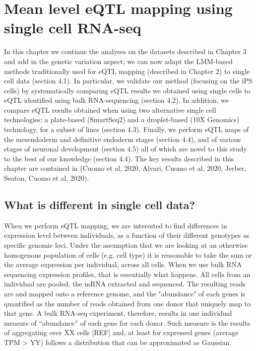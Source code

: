 
\chapter{Mean level eQTL mapping using single cell RNA-seq}

In this chapter we continue the analyses on the datasets described in Chapter 3 and add in the genetic variation aspect; we can now adapt the LMM-based methods traditionally used for eQTL mapping (described in Chapter 2) to single cell data (section 4.1). 
In particular, we validate our method (focusing on the iPS cells) by systematically comparing eQTL results we obtained using single cells to eQTL identified using bulk RNA-sequencing (section 4.2). 
In addition, we compare eQTL results obtained when using two alternative single cell technologies: a plate-based (SmartSeq2) and a droplet-based (10X Genomics) technology, for a subset of lines (section 4.3). 
Finally, we perform eQTL maps of the mesendoderm and definitive endoderm stages (section 4.4), and of various stages of neuronal development (section 4.5) all of which are novel to this study to the best of our knowledge (section 4.4). 
The key results described in this chapter are contained in (Cuomo et al, 2020, Alvari, Cuomo et al, 2020, Jerber, Seaton, Cuomo et al, 2020).

\section{What is different in single cell data?}

When we perform eQTL mapping, we are interested to find differences in expression level between individuals, as a function of their different genotypes as specific genomic loci. 
Under the assumption that we are looking at an otherwise homogenous population of cells (e.g. cell type) it is reasonable to take the sum or the average expression per individual, across all cells.
When we use bulk RNA sequencing expression profiles, that is essentially what happens. 
All cells from an individual are pooled, the mRNA extracted and sequenced. 
The resulting reads are and mapped onto a reference genome, and the "abundance" of each genes is quantified as the number of reads obtained from one donor that uniquely map to that gene. 
A bulk RNA-seq experiment, therefore, results in one individual measure of “abundance” of each gene for each donor. 
Such measure is the results of aggregating over XX cells [REF] and, at least for expressed genes (average TPM > YY) follows a distribution that can be approximated as Gaussian.

